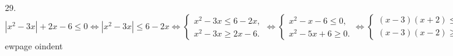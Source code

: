 29. $|x^2-3x|+2x-6\leqslant0\Leftrightarrow|x^2-3x|\leqslant6-2x\Leftrightarrow \begin{cases} x^2-3x\leqslant6-2x,\\ x^2-3x\geqslant2x-6.\end{cases}
\Leftrightarrow \begin{cases} x^2-x-6\leqslant0,\\ x^2-5x+6\geqslant0.\end{cases}
\Leftrightarrow \begin{cases} (x-3)(x+2)\leqslant0,\\ (x-3)(x-2)\geqslant0.\end{cases}
\Leftrightarrow \begin{cases} x\in[-2;3],\\ x\in(-\infty;2]\cup[3;+\infty).\end{cases}\Leftrightarrow x \in [-2;2]\cup\{3\}.$
ewpage
oindent

